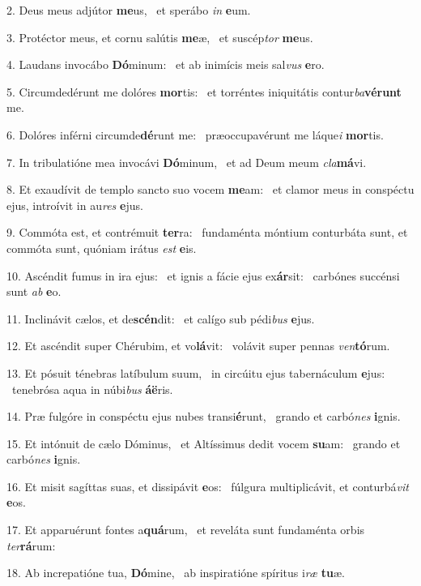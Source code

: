 2. Deus meus adjútor \textbf{me}us, \ast\  et sperábo \textit{in} \textbf{e}um.\

3. Protéctor meus, et cornu salútis \textbf{me}æ, \ast\  et suscép\textit{tor} \textbf{me}us.\

4. Laudans invocábo \textbf{Dó}minum: \ast\  et ab inimícis meis sal\textit{vus} \textbf{e}ro.\

5. Circumdedérunt me dolóres \textbf{mor}tis: \ast\  et torréntes iniquitátis contur\textit{ba}\textbf{vé}\textbf{runt} me.\

6. Dolóres inférni circumde\textbf{dé}runt me: \ast\  præoccupavérunt me láque\textit{i} \textbf{mor}tis.\

7. In tribulatióne mea invocávi \textbf{Dó}minum, \ast\  et ad Deum meum \textit{cla}\textbf{má}vi.\

8. Et exaudívit de templo sancto suo vocem \textbf{me}am: \ast\  et clamor meus in conspéctu ejus, introívit in au\textit{res} \textbf{e}jus.\

9. Commóta est, et contrémuit \textbf{ter}ra: \ast\  fundaménta móntium conturbáta sunt, et commóta sunt, quóniam irátus \textit{est} \textbf{e}is.\

10. Ascéndit fumus in ira ejus: \dag\  et ignis a fácie ejus ex\textbf{ár}sit: \ast\  carbónes succénsi sunt \textit{ab} \textbf{e}o.\

11. Inclinávit cælos, et de\textbf{scén}dit: \ast\  et calígo sub pédi\textit{bus} \textbf{e}jus.\

12. Et ascéndit super Chérubim, et vo\textbf{lá}vit: \ast\  volávit super pennas \textit{ven}\textbf{tó}rum.\

13. Et pósuit ténebras latíbulum suum, \dag\  in circúitu ejus tabernáculum \textbf{e}jus: \ast\  tenebrósa aqua in núbi\textit{bus} \textbf{á}\textbf{ë}ris.\

14. Præ fulgóre in conspéctu ejus nubes transi\textbf{é}runt, \ast\  grando et carbó\textit{nes} \textbf{i}gnis.\

15. Et intónuit de cælo Dóminus, \dag\  et Altíssimus dedit vocem \textbf{su}am: \ast\  grando et carbó\textit{nes} \textbf{i}gnis.\

16. Et misit sagíttas suas, et dissipávit \textbf{e}os: \ast\  fúlgura multiplicávit, et conturbá\textit{vit} \textbf{e}os.\

17. Et apparuérunt fontes a\textbf{quá}rum, \ast\  et reveláta sunt fundaménta orbis \textit{ter}\textbf{rá}rum:\

18. Ab increpatióne tua, \textbf{Dó}mine, \ast\  ab inspiratióne spíritus i\textit{ræ} \textbf{tu}æ.\

